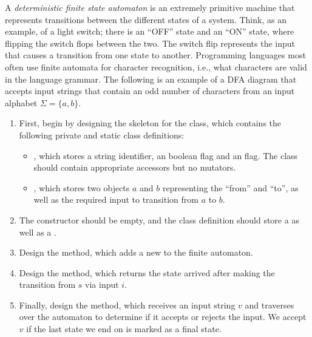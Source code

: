 A \emph{deterministic finite state automaton} is an extremely primitive machine that represents transitions between the different states of a system. Think, as an example, of a light switch; there is an ``OFF'' state and an ``ON'' state, where flipping the switch flops between the two. The switch flip represents the input that causes a transition from one state to another. Programming languages most often use finite automata for character recognition, i.e., what characters are valid in the language grammar. The following is an example of a DFA diagram that accepts input strings that contain an odd number of  characters from an input alphabet $\Sigma = \{a, b\}$.

\begin{enumerate}[label=(\alph*)]
    \item First, begin by designing the skeleton for the  class, which contains the following private and static class definitions:
    \begin{itemize}
        \item {}, which stores a string identifier, an  boolean flag and an  flag. The class should contain appropriate accessors but no mutators.
        \item {}, which stores two  objects $a$ and $b$ representing the ``from'' and ``to'', as well as the required input to transition from $a$ to $b$. 
    \end{itemize}
    \item The  constructor should be empty, and the class definition should store a  as well as a . 
    \item Design the  method, which adds a new  to the finite automaton.
    \item Design the  method, which returns the state arrived after making the transition from $s$ via input $i$.
    \item Finally, design the  method, which receives an input string $v$ and traverses over the automaton to determine if it accepts or rejects the input. We accept $v$ if the last state we end on is marked as a final state.
\end{enumerate}

\newpage %

